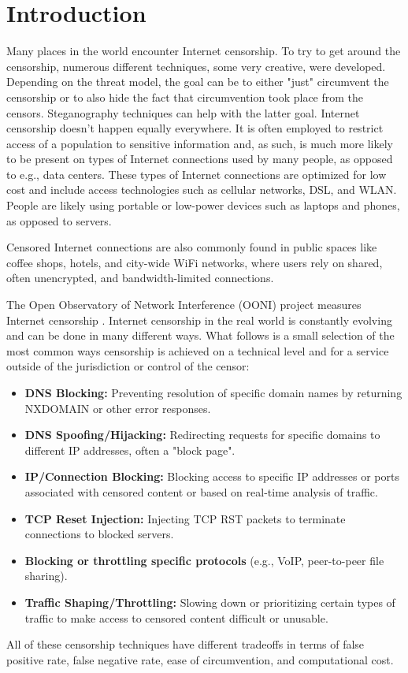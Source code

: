 
\chapter{Introduction}


Many places in the world encounter Internet censorship.
To try to get around the censorship, numerous different techniques, some very creative, were developed.
Depending on the threat model, the goal can be to either "just" circumvent the censorship or to also hide the fact that circumvention took place from the censors.
Steganography \cite{wiki:Steganography} techniques \cite{wiki:List_of_steganography_techniques} can help with the latter goal.
Internet censorship doesn't happen equally everywhere.
It is often employed to restrict access of a population to sensitive information and, as such, is much more likely to be present on types of Internet connections used by many people, as opposed to e.g., data centers.
These types of Internet connections are optimized for low cost and include access technologies such as cellular networks, DSL, and WLAN.
People are likely using portable or low-power devices such as laptops and phones, as opposed to servers.

Censored Internet connections are also commonly found in public spaces like coffee shops, hotels, and city-wide WiFi networks, where users rely on shared, often unencrypted, and bandwidth-limited connections.


The Open Observatory of Network Interference (OONI) project measures Internet censorship \cite{OONI}.
Internet censorship in the real world is constantly evolving and can be done in many different ways.
What follows is a small selection of the most common ways censorship is achieved on a technical level and for a service outside of the jurisdiction or control of the censor:
\begin{itemize}
	\item \noindent\textbf{DNS Blocking:} Preventing resolution of specific domain names by returning NXDOMAIN or other error responses.
	\item \noindent\textbf{DNS Spoofing/Hijacking:} Redirecting requests for specific domains to different IP addresses, often a "block page".
	\item \noindent\textbf{IP/Connection Blocking:} Blocking access to specific IP addresses or ports associated with censored content or based on real-time analysis of traffic.
	\item \noindent\textbf{TCP Reset Injection:} Injecting TCP RST packets to terminate connections to blocked servers.
	\item \noindent\textbf{Blocking or throttling specific protocols} (e.g., VoIP, peer-to-peer file sharing).
	\item \noindent\textbf{Traffic Shaping/Throttling:} Slowing down or prioritizing certain types of traffic to make access to censored content difficult or unusable.
\end{itemize}
All of these censorship techniques have different tradeoffs in terms of false positive rate, false negative rate, ease of circumvention, and computational cost.

